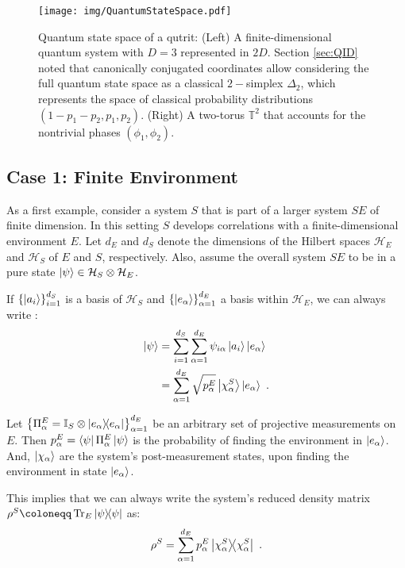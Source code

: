 \documentclass[draft,nofootinbib,pre,twocolumn,showkeys,superscriptaddress,preprintnumbers,floatfix]{revtex4-1}
\newcommand{\1}{\mathbbm{1}}
\begin{document}
\begin{figure}
\texttt{[image: img/QuantumStateSpace.pdf]}
\caption{Quantum state space of a qutrit: (Left) A finite-dimensional quantum
	system with $D=3$ represented in $2D$. Section \ref{sec:QID} noted that
	canonically conjugated coordinates allow considering the full quantum state
	space as a classical $2-$simplex $\Delta_2$, which represents the space of
	classical probability distributions $(1-p_1-p_2,p_1,p_2)$. (Right) A
	two-torus $\mathbb{T}^2$ that accounts for the nontrivial phases
	$\left(\phi_1,\phi_2\right)$.
	}
\label{fig:QSP} 
\end{figure}

\subsection{Case 1: Finite Environment}
\label{sec:Example1}

As a first example, consider a system $S$ that is part of a larger system $SE$
of finite dimension. In this setting $S$ develops correlations with a
finite-dimensional environment $E$. Let $d_E$ and $d_S$ denote the dimensions
of the Hilbert spaces $\mathcal{H}_E$ and $\mathcal{H}_S$ of $E$ and $S$,
respectively. Also, assume the overall system $SE$ to be in a pure state
$\ket{\psi} \in \mathcal{H}_S \otimes \mathcal{H}_E$. 

If $\left\{ \ket{a_i}\right\}_{i=1}^{d_S}$ is a basis of $\mathcal{H}_S$ and
$\left\{ \ket{e_\alpha}\right\}_{\alpha=1}^{d_E}$ a basis within
$\mathcal{H}_E$, we can always write \cite{Anza20a}:
\begin{align}
\ket{\psi} & = \sum_{i=1}^{d_S} \sum_{\alpha=1}^{d_E}
  \psi_{i\alpha} \ket{a_i}\ket{e_\alpha} \nonumber \\
  & = \sum_{\alpha=1}^{d_E} \sqrt{p_\alpha^E} \ket{\chi_\alpha^S}\ket{e_\alpha}
~.
\label{eq:rev_Schmidt}
\end{align}

Let $\left\{\Pi^E_\alpha = \mathbb{I}_S \otimes \ket{e_\alpha} \!\!
\bra{e_\alpha}\right\}_{\alpha=1}^{d_E}$ be an arbitrary set of projective
measurements on $E$. Then $p_\alpha^E = \bra{\psi} \Pi^E_\alpha \ket{\psi}$ is
the probability of finding the environment in $\ket{e_\alpha}$. And,
$\ket{\chi_\alpha}$ are the system's post-measurement states, upon finding the
environment in state $\ket{e_\alpha}$.

This implies that we can always write the system's reduced density matrix
$\rho^S \coloneqq \Tr_E \ket{\psi} \!\! \bra{\psi}$ as:
\begin{align}
\rho^S = \sum_{\alpha=1}^{d_E} p_\alpha^E \ket{\chi_\alpha^S}\!\!\bra{\chi_\alpha^S}
  ~.
\label{eq:rho_S}
\end{align}
\end{document}
